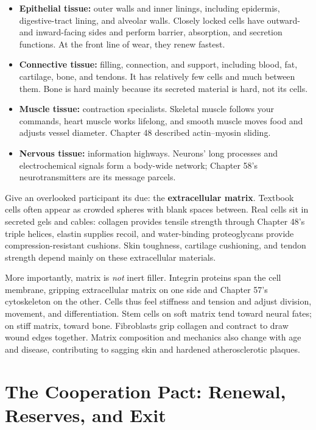 \begin{itemize}[itemsep=2pt]
\item \textbf{Epithelial tissue:} outer walls and inner linings, including epidermis, digestive-tract lining, and alveolar walls. Closely locked cells have outward- and inward-facing sides and perform barrier, absorption, and secretion functions. At the front line of wear, they renew fastest.
\item \textbf{Connective tissue:} filling, connection, and support, including blood, fat, cartilage, bone, and tendons. It has relatively few cells and much between them. Bone is hard mainly because its secreted material is hard, not its cells.
\item \textbf{Muscle tissue:} contraction specialists. Skeletal muscle follows your commands, heart muscle works lifelong, and smooth muscle moves food and adjusts vessel diameter. Chapter 48 described actin--myosin sliding.
\item \textbf{Nervous tissue:} information highways. Neurons' long processes and electrochemical signals form a body-wide network; Chapter 58's neurotransmitters are its message parcels.
\end{itemize}

Give an overlooked participant its due: the \textbf{extracellular matrix}. Textbook cells often appear as crowded spheres with blank spaces between. Real cells sit in secreted gels and cables: collagen provides tensile strength through Chapter 48's triple helices, elastin supplies recoil, and water-binding proteoglycans provide compression-resistant cushions. Skin toughness, cartilage cushioning, and tendon strength depend mainly on these extracellular materials.

More importantly, matrix is \emph{not} inert filler. Integrin proteins span the cell membrane, gripping extracellular matrix on one side and Chapter 57's cytoskeleton on the other. Cells thus feel stiffness and tension and adjust division, movement, and differentiation. Stem cells on soft matrix tend toward neural fates; on stiff matrix, toward bone. Fibroblasts grip collagen and contract to draw wound edges together. Matrix composition and mechanics also change with age and disease, contributing to sagging skin and hardened atherosclerotic plaques.

\section{The Cooperation Pact: Renewal, Reserves, and Exit}

